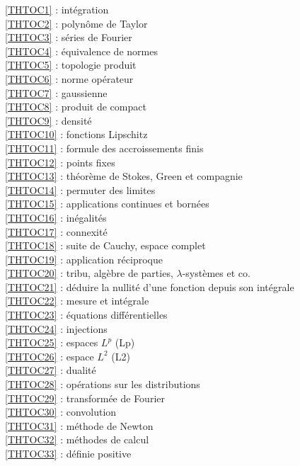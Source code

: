 \ref {THTOC1} : intégration\\
\ref {THTOC2} : polynôme de Taylor\\
\ref {THTOC3} : séries de Fourier\\
\ref {THTOC4} : équivalence de normes\\
\ref {THTOC5} : topologie produit\\
\ref {THTOC6} : norme opérateur\\
\ref {THTOC7} : gaussienne\\
\ref {THTOC8} : produit de compact\\
\ref {THTOC9} : densité\\
\ref {THTOC10} : fonctions Lipschitz\\
\ref {THTOC11} : formule des accroissements finis\\
\ref {THTOC12} : points fixes\\
\ref {THTOC13} : théorème de Stokes, Green et compagnie\\
\ref {THTOC14} : permuter des limites\\
\ref {THTOC15} : applications continues et bornées\\
\ref {THTOC16} : inégalités\\
\ref {THTOC17} : connexité\\
\ref {THTOC18} : suite de Cauchy, espace complet\\
\ref {THTOC19} : application réciproque\\
\ref {THTOC20} : tribu, algèbre de parties, \( \lambda \)-systèmes et co.\\
\ref {THTOC21} : déduire la nullité d'une fonction depuis son intégrale\\
\ref {THTOC22} : mesure et intégrale\\
\ref {THTOC23} : équations différentielles\\
\ref {THTOC24} : injections\\
\ref {THTOC25} : espaces \( L^p\) (Lp)\\
\ref {THTOC26} : espace \( L^2\) (L2)\\
\ref {THTOC27} : dualité\\
\ref {THTOC28} : opérations sur les distributions\\
\ref {THTOC29} : transformée de Fourier\\
\ref {THTOC30} : convolution\\
\ref {THTOC31} : méthode de Newton\\
\ref {THTOC32} : méthodes de calcul\\
\ref {THTOC33} : définie positive\\
